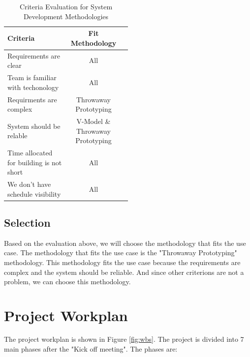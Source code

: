 \documentclass[a4paper]{report}
\begin{document}
\begin{table}[htbp]
    \centering
    \caption{Criteria Evaluation for System Development Methodologies}
    \label{tab:criteria-evaulation}
    \begin{tabular}{@{}p{0.5\linewidth}cc@{}}
        \toprule
        Criteria                                 & Fit Methodology                  \\
        \midrule
        Requirements are clear                   & All                              \\
        Team is familiar with techonology        & All                              \\
        Requirments are complex                  & Throwaway Prototyping            \\
        System should be relable                 & V-Model \& Throwaway Prototyping \\
        Time allocated for building is not short & All                              \\
        We don't have schedule visibility        & All                              \\
        \bottomrule
    \end{tabular}
\end{table}

\section{Selection}

Based on the evaluation above, we will choose the methodology that fits the use case. The methodology that fits the use case is the "Throwaway Prototyping" methodology. This methodology fits the use case because the requirements are complex and the system should be reliable. And since other criterions are not a problem, we can choose this methodology.

\chapter{Project Workplan}

The project workplan is shown in Figure \ref{fig:wbs}. The project is divided into 7 main phases after the "Kick off meeting". The phases are:
\end{document}
